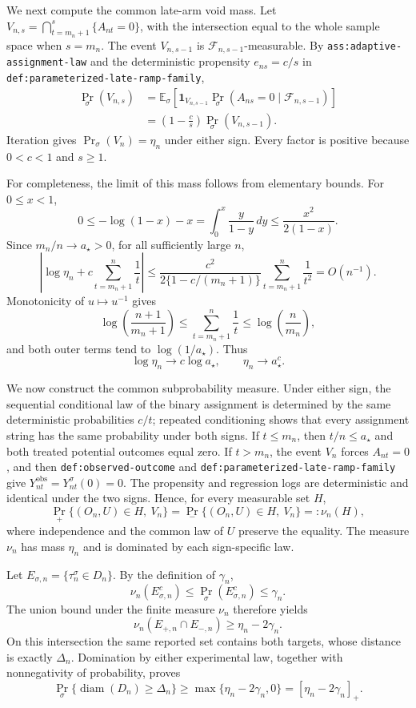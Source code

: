 We next compute the common late-arm void mass. Let
\(V_{n,s}=\bigcap_{t=m_n+1}^{s}\{A_{nt}=0\}\), with the intersection equal to the whole sample space when \(s=m_n\). The event \(V_{n,s-1}\) is \(\mathcal F_{n,s-1}\)-measurable. By \texttt{ass:adaptive-assignment-law} and the deterministic propensity \(e_{ns}=c/s\) in \texttt{def:parameterized-late-ramp-family},
\[
 \begin{aligned}
 \Pr_\sigma(V_{n,s})
 &=\mathbb E_\sigma\!\left[
   \mathbf 1_{V_{n,s-1}}
   \Pr_\sigma(A_{ns}=0\mid\mathcal F_{n,s-1})
 \right]\\
 &=\left(1-\frac cs\right)\Pr_\sigma(V_{n,s-1}).
 \end{aligned}
\]
Iteration gives \(\Pr_\sigma(V_n)=\eta_n\) under either sign. Every factor is positive because \(0<c<1\) and \(s\ge1\).

For completeness, the limit of this mass follows from elementary bounds. For \(0\le x<1\),
\[
 0\le-\log(1-x)-x
 =\int_0^x\frac y{1-y}\,dy
 \le\frac{x^2}{2(1-x)}.
\]
Since \(m_n/n\to a_\star>0\), for all sufficiently large \(n\),
\[
 \left|\log\eta_n+c\sum_{t=m_n+1}^{n}\frac1t\right|
 \le
 \frac{c^2}{2\{1-c/(m_n+1)\}}
 \sum_{t=m_n+1}^{n}\frac1{t^2}
 =O(n^{-1}).
\]
Monotonicity of \(u\mapsto u^{-1}\) gives
\[
 \log\!\left(\frac{n+1}{m_n+1}\right)
 \le\sum_{t=m_n+1}^{n}\frac1t
 \le\log\!\left(\frac n{m_n}\right),
\]
and both outer terms tend to \(\log(1/a_\star)\). Thus
\[
 \log\eta_n\to c\log a_\star,
 \qquad \eta_n\to a_\star^c.
\]

We now construct the common subprobability measure. Under either sign, the sequential conditional law of the binary assignment is determined by the same deterministic probabilities \(c/t\); repeated conditioning shows that every assignment string has the same probability under both signs. If \(t\le m_n\), then \(t/n\le a_\star\) and both treated potential outcomes equal zero. If \(t>m_n\), the event \(V_n\) forces \(A_{nt}=0\), and then \texttt{def:observed-outcome} and \texttt{def:parameterized-late-ramp-family} give \(Y_{nt}^{\mathrm{obs}}=Y_{nt}^\sigma(0)=0\). The propensity and regression logs are deterministic and identical under the two signs. Hence, for every measurable set \(H\),
\[
 \Pr_+\{(O_n,U)\in H,\ V_n\}
 =\Pr_-\{(O_n,U)\in H,\ V_n\}
 =:\nu_n(H),
\]
where independence and the common law of \(U\) preserve the equality. The measure \(\nu_n\) has mass \(\eta_n\) and is dominated by each sign-specific law.

Let \(E_{\sigma,n}=\{\tau_n^\sigma\in D_n\}\). By the definition of \(\gamma_n\),
\[
 \nu_n(E_{\sigma,n}^c)
 \le\Pr_\sigma(E_{\sigma,n}^c)
 \le\gamma_n.
\]
The union bound under the finite measure \(\nu_n\) therefore yields
\[
 \nu_n(E_{+,n}\cap E_{-,n})
 \ge\eta_n-2\gamma_n.
\]
On this intersection the same reported set contains both targets, whose distance is exactly \(\Delta_n\). Domination by either experimental law, together with nonnegativity of probability, proves
\[
 \Pr_\sigma\{\operatorname{diam}(D_n)\ge\Delta_n\}
 \ge\max\{\eta_n-2\gamma_n,0\}
 =[\eta_n-2\gamma_n]_+.
\]

